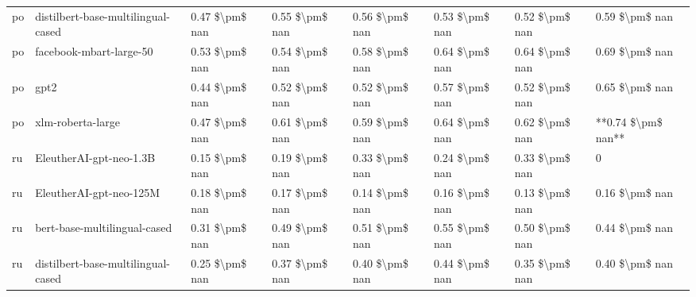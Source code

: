\begin{tabular}{llllllll}
      po & distilbert-base-multilingual-cased & 0.47 \$\textbackslash pm\$ nan &            0.55 \$\textbackslash pm\$ nan &        0.56 \$\textbackslash pm\$ nan &         0.53 \$\textbackslash pm\$ nan &                          0.52 \$\textbackslash pm\$ nan &     0.59 \$\textbackslash pm\$ nan \\
      po &            facebook-mbart-large-50 & 0.53 \$\textbackslash pm\$ nan &            0.54 \$\textbackslash pm\$ nan &        0.58 \$\textbackslash pm\$ nan &         0.64 \$\textbackslash pm\$ nan &                          0.64 \$\textbackslash pm\$ nan &     0.69 \$\textbackslash pm\$ nan \\
      po &                               gpt2 & 0.44 \$\textbackslash pm\$ nan &            0.52 \$\textbackslash pm\$ nan &        0.52 \$\textbackslash pm\$ nan &         0.57 \$\textbackslash pm\$ nan &                          0.52 \$\textbackslash pm\$ nan &     0.65 \$\textbackslash pm\$ nan \\
      po &                  xlm-roberta-large & 0.47 \$\textbackslash pm\$ nan &            0.61 \$\textbackslash pm\$ nan &        0.59 \$\textbackslash pm\$ nan &         0.64 \$\textbackslash pm\$ nan &                          0.62 \$\textbackslash pm\$ nan & **0.74 \$\textbackslash pm\$ nan** \\
      ru &            EleutherAI-gpt-neo-1.3B & 0.15 \$\textbackslash pm\$ nan &            0.19 \$\textbackslash pm\$ nan &        0.33 \$\textbackslash pm\$ nan &         0.24 \$\textbackslash pm\$ nan &                          0.33 \$\textbackslash pm\$ nan &                  0 \\
      ru &            EleutherAI-gpt-neo-125M & 0.18 \$\textbackslash pm\$ nan &            0.17 \$\textbackslash pm\$ nan &        0.14 \$\textbackslash pm\$ nan &         0.16 \$\textbackslash pm\$ nan &                          0.13 \$\textbackslash pm\$ nan &     0.16 \$\textbackslash pm\$ nan \\
      ru &       bert-base-multilingual-cased & 0.31 \$\textbackslash pm\$ nan &            0.49 \$\textbackslash pm\$ nan &        0.51 \$\textbackslash pm\$ nan &         0.55 \$\textbackslash pm\$ nan &                          0.50 \$\textbackslash pm\$ nan &     0.44 \$\textbackslash pm\$ nan \\
      ru & distilbert-base-multilingual-cased & 0.25 \$\textbackslash pm\$ nan &            0.37 \$\textbackslash pm\$ nan &        0.40 \$\textbackslash pm\$ nan &         0.44 \$\textbackslash pm\$ nan &                          0.35 \$\textbackslash pm\$ nan &     0.40 \$\textbackslash pm\$ nan \\

\end{tabular}
